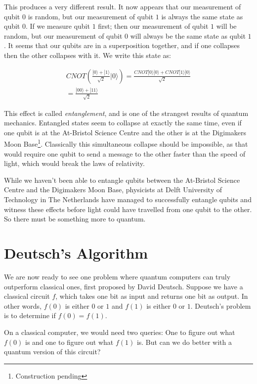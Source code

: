 \documentclass[twocolumn]{article}
\begin{document}
This produces a very different result. It now appears that our measurement of qubit $0$ is random, but our measurement of qubit $1$ is always the same state as qubit $0$. If we measure qubit $1$ first; then our measurement of qubit $1$ will be random, but our measurement of qubit $0$ will always be the same state as qubit $1$. It seems that our qubits are in a superposition together, and if one collapses then the other collapses with it. We write this state as:

\begin{gather*}
CNOT\left(\frac{|0\rangle + |1\rangle}{\sqrt{2}}|0\rangle\right) = \frac{CNOT|0\rangle|0\rangle + CNOT|1\rangle|0\rangle}{\sqrt{2}}\\
= \frac{|00\rangle + |11\rangle}{\sqrt{2}}
\end{gather*}

This effect is called {\em entanglement}, and is one of the strangest results of quantum mechanics. Entangled states seem to collapse at exactly the same time, even if one qubit is at the At-Bristol Science Centre and the other is at the Digimakers Moon Base\footnote{Construction pending}. Classically this simultaneous collapse should be impossible, as that would require one qubit to send a message to the other faster than the speed of light, which would break the laws of relativity.

While we haven't been able to entangle qubits between the At-Bristol Science Centre and the Digimakers Moon Base, physicists at Delft University of Technology in The Netherlands have managed to successfully entangle qubits and witness these effects before light could have travelled from one qubit to the other. So there must be something more to quantum.

\section{Deutsch's Algorithm}

We are now ready to see one problem where quantum computers can truly outperform classical ones, first proposed by David Deutsch. Suppose we have a classical circuit $f$, which takes one bit as input and returns one bit as output. In other words, $f(0)$ is either $0$ or $1$ and $f(1)$ is either $0$ or $1$. Deutsch's problem is to determine if $f(0) = f(1)$.

On a classical computer, we would need two queries: One to figure out what $f(0)$ is and one to figure out what $f(1)$ is. But can we do better with a quantum version of this circuit?
\end{document}

